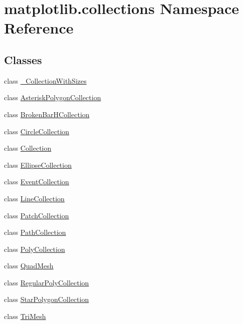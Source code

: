\hypertarget{namespacematplotlib_1_1collections}{}\section{matplotlib.\+collections Namespace Reference}
\label{namespacematplotlib_1_1collections}
\subsection*{Classes}
\begin{DoxyCompactItemize}
\item 
class \hyperlink{classmatplotlib_1_1collections_1_1__CollectionWithSizes}{\+\_\+\+Collection\+With\+Sizes}
\item 
class \hyperlink{classmatplotlib_1_1collections_1_1AsteriskPolygonCollection}{Asterisk\+Polygon\+Collection}
\item 
class \hyperlink{classmatplotlib_1_1collections_1_1BrokenBarHCollection}{Broken\+Bar\+H\+Collection}
\item 
class \hyperlink{classmatplotlib_1_1collections_1_1CircleCollection}{Circle\+Collection}
\item 
class \hyperlink{classmatplotlib_1_1collections_1_1Collection}{Collection}
\item 
class \hyperlink{classmatplotlib_1_1collections_1_1EllipseCollection}{Ellipse\+Collection}
\item 
class \hyperlink{classmatplotlib_1_1collections_1_1EventCollection}{Event\+Collection}
\item 
class \hyperlink{classmatplotlib_1_1collections_1_1LineCollection}{Line\+Collection}
\item 
class \hyperlink{classmatplotlib_1_1collections_1_1PatchCollection}{Patch\+Collection}
\item 
class \hyperlink{classmatplotlib_1_1collections_1_1PathCollection}{Path\+Collection}
\item 
class \hyperlink{classmatplotlib_1_1collections_1_1PolyCollection}{Poly\+Collection}
\item 
class \hyperlink{classmatplotlib_1_1collections_1_1QuadMesh}{Quad\+Mesh}
\item 
class \hyperlink{classmatplotlib_1_1collections_1_1RegularPolyCollection}{Regular\+Poly\+Collection}
\item 
class \hyperlink{classmatplotlib_1_1collections_1_1StarPolygonCollection}{Star\+Polygon\+Collection}
\item 
class \hyperlink{classmatplotlib_1_1collections_1_1TriMesh}{Tri\+Mesh}
\end{DoxyCompactItemize}
